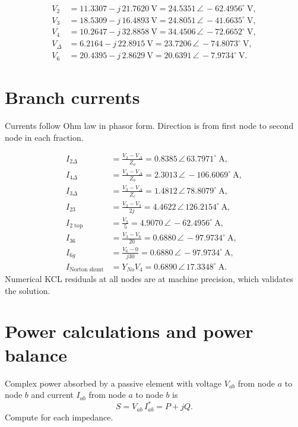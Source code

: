 \documentclass{article}
\newcommand{\ang}[1]{\,\angle\,#1^{\circ}}
\begin{document}
\[
\begin{aligned}
V_2 &= 11.3307 - j\,21.7620\ \mathrm{V} 
= 24.5351\ang{-62.4956}\ \mathrm{V},\\
V_3 &= 18.5309 - j\,16.4893\ \mathrm{V} 
= 24.8051\ang{-41.6635}\ \mathrm{V},\\
V_4 &= 10.2647 - j\,32.8858\ \mathrm{V} 
= 34.4506\ang{-72.6652}\ \mathrm{V},\\
V_{\Delta} &= 6.2164 - j\,22.8915\ \mathrm{V} 
= 23.7206\ang{-74.8073}\ \mathrm{V},\\
V_6 &= 20.4395 - j\,2.8629\ \mathrm{V}
= 20.6391\ang{-7.9734}\ \mathrm{V}.
\end{aligned}
\]

\section*{Branch currents}
Currents follow Ohm law in phasor form. Direction is from first node to second node in each fraction.

\[
\begin{aligned}
I_{2\Delta} &= \frac{V_2 - V_{\Delta}}{Z_a}
= 0.8385\ang{63.7971}\ \mathrm{A},\\
I_{4\Delta} &= \frac{V_4 - V_{\Delta}}{Z_b}
= 2.3013\ang{-106.6069}\ \mathrm{A},\\
I_{3\Delta} &= \frac{V_3 - V_{\Delta}}{Z_c}
= 1.4812\ang{78.8079}\ \mathrm{A},\\
I_{23} &= \frac{V_2 - V_3}{2j}
= 4.4622\ang{126.2154}\ \mathrm{A},\\
I_{2\text{ top}} &= \frac{V_2}{5}
= 4.9070\ang{-62.4956}\ \mathrm{A},\\
I_{36} &= \frac{V_3 - V_6}{20}
= 0.6880\ang{-97.9734}\ \mathrm{A},\\
I_{6g} &= \frac{V_6 - 0}{j30}
= 0.6880\ang{-97.9734}\ \mathrm{A},\\
I_{\text{Norton shunt}} &= Y_{No} V_4
= 0.6890\ang{17.3348}\ \mathrm{A}.
\end{aligned}
\]
Numerical KCL residuals at all nodes are at machine precision, which validates the solution.

\section*{Power calculations and power balance}

Complex power absorbed by a passive element with voltage $V_{ab}$ from node $a$ to node $b$ and current $I_{ab}$ from node $a$ to node $b$ is
\[
S = V_{ab}\,I_{ab}^{*} = P + jQ.
\]
Compute for each impedance.
\end{document}
